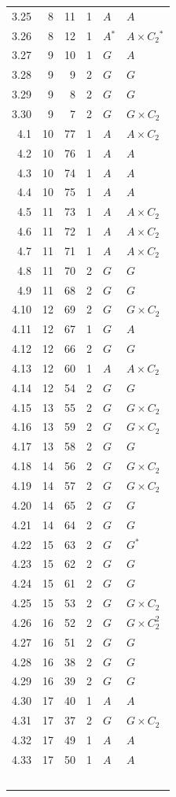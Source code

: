 \begin{longtable}{rrrrll}
3.25&8&11&1&$A$&$A$\\
3.26&8&12&1&$A$$^*$&$A\times C_2$$^*$\\
3.27&9&10&1&$G$&$A$\\
3.28&9&9&2&$G$&$G$\\
3.29&9&8&2&$G$&$G$\\
3.30&9&7&2&$G$&$G\times C_2$\\
4.1&10&77&1&$A$&$A\times C_2$\\
4.2&10&76&1&$A$&$A$\\
4.3&10&74&1&$A$&$A$\\
4.4&10&75&1&$A$&$A$\\
4.5&11&73&1&$A$&$A\times C_2$\\
4.6&11&72&1&$A$&$A\times C_2$\\
4.7&11&71&1&$A$&$A\times C_2$\\
4.8&11&70&2&$G$&$G$\\
4.9&11&68&2&$G$&$G$\\
4.10&12&69&2&$G$&$G\times C_2$\\
4.11&12&67&1&$G$&$A$\\
4.12&12&66&2&$G$&$G$\\
4.13&12&60&1&$A$&$A\times C_2$\\
4.14&12&54&2&$G$&$G$\\
4.15&13&55&2&$G$&$G\times C_2$\\
4.16&13&59&2&$G$&$G\times C_2$\\
4.17&13&58&2&$G$&$G$\\
4.18&14&56&2&$G$&$G\times C_2$\\
4.19&14&57&2&$G$&$G\times C_2$\\
4.20&14&65&2&$G$&$G$\\
4.21&14&64&2&$G$&$G$\\
4.22&15&63&2&$G$&$G$$^*$\\
4.23&15&62&2&$G$&$G$\\
4.24&15&61&2&$G$&$G$\\
4.25&15&53&2&$G$&$G\times C_2$\\
4.26&16&52&2&$G$&$G\times C_2^2$\\
4.27&16&51&2&$G$&$G$\\
4.28&16&38&2&$G$&$G$\\
4.29&16&39&2&$G$&$G$\\
4.30&17&40&1&$A$&$A$\\
4.31&17&37&2&$G$&$G\times C_2$\\
4.32&17&49&1&$A$&$A$\\
4.33&17&50&1&$A$&$A$\\
$$
\end{longtable}
